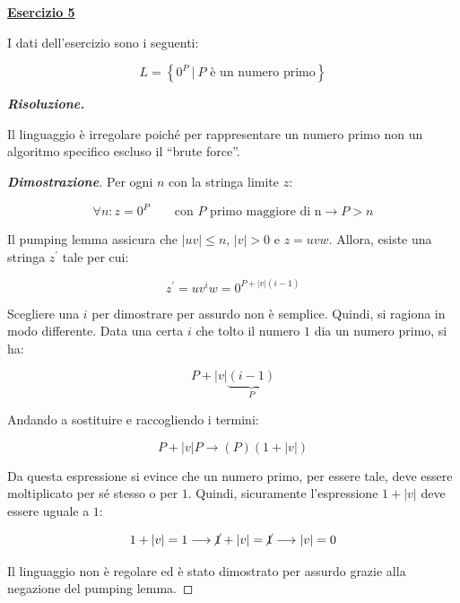 \documentclass[a4paper]{article}
\newcommand{\dquotes}[1]{``#1''}
\begin{document}
	\noindent
	\textcolor{Red3}{\textbf{\underline{Esercizio 5}}}\newline
	
	\noindent
	I dati dell'esercizio sono i seguenti:
	
	\begin{equation*}
		L = \left\{0^{P} \: \left| \: P \text{ è un numero primo} \right.\right\}
	\end{equation*}\newline
	
	\noindent
	\textcolor{Green4}{\textbf{\emph{Risoluzione.}}}\newline
	
	\noindent
	Il linguaggio è irregolare poiché per rappresentare un numero primo non un algoritmo specifico escluso il \dquotes{brute force}.
	
	\begin{proof}[\textcolor{Blue3}{\textbf{Dimostrazione}}]
		Per ogni $n$ con la stringa limite $z$:
		
		\begin{equation*}
			\forall n : z = 0^{P} \hspace{2em} \text{con } P \text{ primo maggiore di n} \rightarrow P > n
		\end{equation*}
	
		\noindent
		Il pumping lemma assicura che $|uv| \le n$, $|v| > 0$ e $z = uvw$. Allora, esiste una stringa $z^{'}$ tale per cui:
		
		\begin{equation*}
			z^{'} = uv^{i}w = 0^{P + |v|\left(i-1\right)}
		\end{equation*}
	
		\noindent
		Scegliere una $i$ per dimostrare per assurdo non è semplice. Quindi, si ragiona in modo differente. Data una certa $i$ che tolto il numero $1$ dia un numero primo, si ha:
		
		\begin{equation*}
			P + |v| \underbrace{\left(i - 1\right)}_{P}
		\end{equation*}
	
		\noindent
		Andando a sostituire e raccogliendo i termini:
		
		\begin{equation*}
			P + |v|P \longrightarrow \left(P\right) \left(1 + |v|\right)
		\end{equation*}
	
		\noindent
		Da questa espressione si evince che un numero primo, per essere tale, deve essere moltiplicato per sé stesso o per $1$. Quindi, sicuramente l'espressione $1 + |v|$ deve essere uguale a $1$:
		
		\begin{equation*}
			1 + |v| = 1 \longrightarrow \cancel{1} + |v| = \cancel{1} \longrightarrow |v| = 0
		\end{equation*}
	
		\noindent
		Il linguaggio non è regolare ed è stato dimostrato per assurdo grazie alla negazione del pumping lemma.
	\end{proof}
\end{document}
